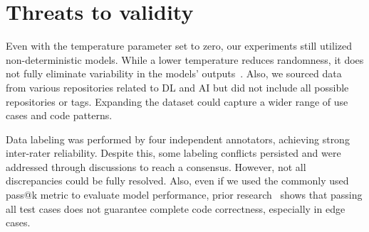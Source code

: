 \section{Threats to validity}

Even with the temperature parameter set to zero, our experiments still utilized non-deterministic models. While a lower temperature reduces randomness, it does not fully eliminate variability in the models' outputs~\cite{ouyang2023llm,song2024good}. Also, we sourced data from various repositories related to DL and AI but did not include all possible repositories or tags. Expanding the dataset could capture a wider range of use cases and code patterns. 

Data labeling was performed by four independent annotators, achieving strong inter-rater reliability. Despite this, some labeling conflicts persisted and were addressed through discussions to reach a consensus. However, not all discrepancies could be fully resolved. Also, even if we used the commonly used pass@k metric to evaluate model performance, prior research~\cite{shiri2024history} shows that passing all test cases does not guarantee complete code correctness, especially in edge cases.
